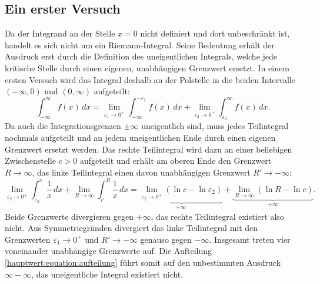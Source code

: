 \subsection{Ein erster Versuch}
Da der Integrand an der Stelle $x = 0$ nicht definiert und dort unbeschränkt
ist, handelt es sich nicht um ein Riemann-Integral.
%
Seine Bedeutung erhält der Ausdruck erst durch die Definition des
uneigentlichen Integrals, welche jede kritische Stelle durch einen eigenen,
unabhängigen Grenzwert ersetzt.
In einem ersten Versuch wird das Integral deshalb an der Polstelle in die
beiden Intervalle $(-\infty,0)$ und $(0,\infty)$ aufgeteilt:
\begin{equation}
\int_{-\infty}^{\infty} f(x)\,dx
= \lim_{\varepsilon_1\to 0^+} \int_{-\infty}^{-\varepsilon_1} f(x)\,dx
+ \lim_{\varepsilon_2\to 0^+} \int_{\varepsilon_2}^{\infty} f(x)\,dx.
\label{hauptwert:equation:aufteilung}
\end{equation}
Da auch die Integrationsgrenzen $\pm\infty$ uneigentlich sind,
muss jedes Teilintegral nochmals aufgeteilt
und an jedem uneigentlichen Ende durch einen eigenen Grenzwert ersetzt werden.
Das rechte Teilintegral wird dazu an einer beliebigen Zwischenstelle
$c > 0$ aufgeteilt und erhält am oberen Ende den Grenzwert $R \to \infty$,
das linke Teilintegral einen davon unabhängigen Grenzwert $R' \to -\infty$:
\begin{equation}
\lim_{\varepsilon_2\to 0^+} \int_{\varepsilon_2}^{c} \frac{1}{x}\,dx
+ \lim_{R\to\infty} \int_{c}^{R} \frac{1}{x}\,dx
= \underbrace{\lim_{\varepsilon_2\to 0^+} \left(\ln c - \ln \varepsilon_2\right)}_{+\infty}
+ \underbrace{\lim_{R\to\infty} \left(\ln R - \ln c\right)}_{+\infty}.
\label{hauptwert:equation:rechts}
\end{equation}
Beide Grenzwerte divergieren gegen $+\infty$,
das rechte Teilintegral existiert also nicht.
Aus Symmetriegründen divergiert das linke Teilintegral
mit den Grenzwerten $\varepsilon_1 \to 0^+$ und $R' \to -\infty$
genauso gegen $-\infty$.
Insgesamt treten vier voneinander unabhängige Grenzwerte auf.
Die Aufteilung \eqref{hauptwert:equation:aufteilung} führt somit auf den
unbestimmten Ausdruck $\infty - \infty$,
das uneigentliche Integral existiert nicht.

